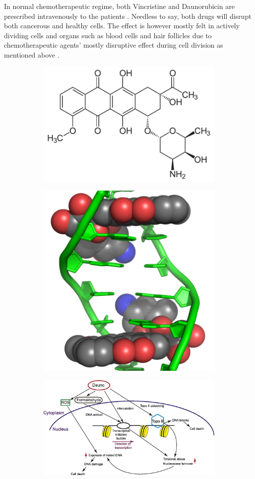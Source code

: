 \documentclass[pdftex,12pt,a4paper]{report}
\begin{document}
In normal chemotherapeutic regime, both Vincristine and Daunorubicin are prescribed intravenously to the patients \cite{skeel2011handbook}. Needless to say, both drugs will disrupt both cancerous and healthy cells. The effect is however mostly felt in actively dividing cells and organs such as blood cells  and hair follicles due to chemotherapeutic agents' mostly disruptive effect during cell division as mentioned above \cite{skeel2011handbook, mayo2018chemotherapy}.

\begin{figure}[H]
\centering
\begin{subfigure}{.8\textwidth}
  \centering
  \includegraphics[width=.5\textwidth]{images/daunorubicin}
  \caption{}
  \label{fig:dauno}
\end{subfigure}
\centering
\begin{subfigure}{.8\textwidth}
  \centering
  \includegraphics[width=.5\textwidth]{images/doxorubicin_dna}
  \caption{}
  \label{fig:anthracyclines_dna}
\end{subfigure}
\centering
\begin{subfigure}{.9\textwidth}
  \centering
  \includegraphics[width=.8\textwidth]{images/daunorubicin_mechanism}

\end{subfigure}
\end{figure}
\end{document}
